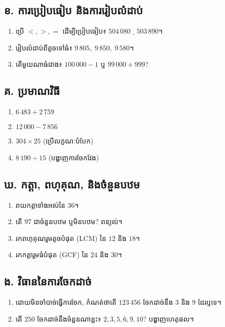     \subsection*{ខ. ការប្រៀបធៀប និងការរៀបលំដាប់}
    \begin{enumerate}[label=\arabic*.]
        \item ប្រើ $<,>,=$ ដើម្បីប្រៀបធៀប៖ $504\,080\;\_\;503\,890$។
        \item រៀបលំដាប់ពីតូចទៅធំ៖ $9\,805,\;9\,850,\;9\,580$។
        \item តើមួយណាធំជាង៖ $100\,000-1$ ឬ $99\,000+999$?
    \end{enumerate}

    \subsection*{គ. ប្រមាណវិធី}
    \begin{multicols}{2}
        \begin{enumerate}[label=\arabic*.]
            \item $6\,483 + 2\,759$
            \item $12\,000 - 7\,856$
            \item $304\times 25$ (ប្រើលក្ខណៈបំបែក)
            \item $8\,190\div 15$ (បង្ហាញការចែកវែង)
        \end{enumerate}
    \end{multicols}

    \subsection*{ឃ. កត្តា, ពហុគុណ, និងចំនួនបឋម}
    \begin{enumerate}[label=\arabic*.]
        \item រាយកត្តាទាំងអស់នៃ $36$។
        \item តើ $97$ ជាចំនួនបឋម ឬមិនបឋម? ពន្យល់។
        \item រកពហុគុណរួមតូចបំផុត (LCM) នៃ $12$ និង $18$។
        \item រកកត្តារួមធំបំផុត (GCF) នៃ $24$ និង $30$។
    \end{enumerate}

    \subsection*{ង. វិធាននៃការចែកដាច់}
    \begin{enumerate}[label=\arabic*.]
        \item ដោយមិនចាំបាច់ធ្វើការចែក, កំណត់ថាតើ $123\,456$ ចែកដាច់នឹង 3 និង 9 ដែរឬទេ។
        \item តើ $250$ ចែកដាច់នឹងចំនួនណាខ្លះ៖ $2,3,5,6,9,10$? បង្ហាញហេតុផល។
    \end{enumerate}


